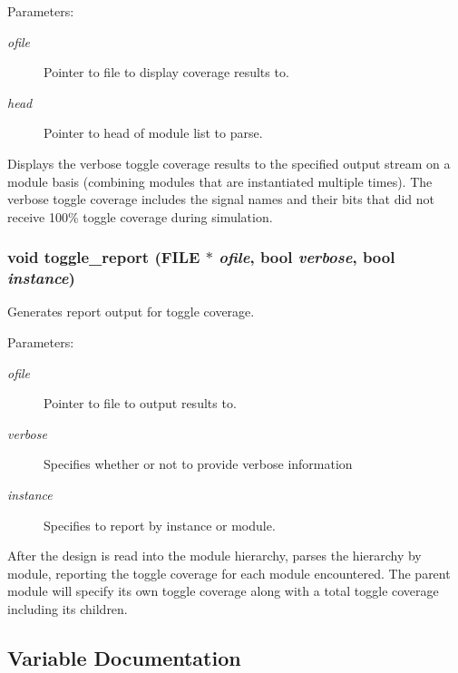 \begin{Desc}
\item[Parameters: ]\par
\begin{description}
\item[{\em 
ofile}]Pointer to file to display coverage results to. \item[{\em 
head}]Pointer to head of module list to parse.\end{description}
\end{Desc}
Displays the verbose toggle coverage results to the specified output stream on a module basis (combining modules that are instantiated multiple times). The verbose toggle coverage includes the signal names and their bits that did not receive 100\% toggle coverage during simulation. 
\subsubsection{\setlength{\rightskip}{0pt plus 5cm}void toggle\_\-report (FILE $\ast$ {\em ofile}, {\bf bool} {\em verbose}, {\bf bool} {\em instance})}\label{toggle_8c_a8}


Generates report output for toggle coverage.

\begin{Desc}
\item[Parameters: ]\par
\begin{description}
\item[{\em 
ofile}]Pointer to file to output results to. \item[{\em 
verbose}]Specifies whether or not to provide verbose information \item[{\em 
instance}]Specifies to report by instance or module.\end{description}
\end{Desc}
After the design is read into the module hierarchy, parses the hierarchy by module, reporting the toggle coverage for each module encountered. The parent module will specify its own toggle coverage along with a total toggle coverage including its  children. 

\subsection{Variable Documentation}
